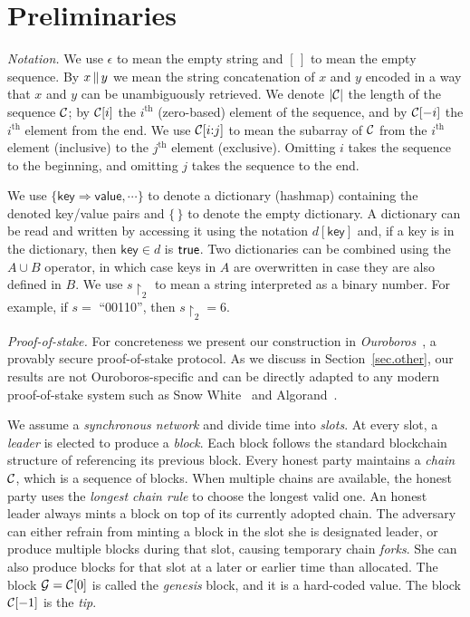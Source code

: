 \section{Preliminaries}

\noindent
\emph{Notation.}
We use $\epsilon$ to mean the empty string and $[\,]$ to mean the empty sequence.
By $x \,\|\, y$ we mean the string concatenation
of $x$ and $y$ encoded in a way that $x$ and $y$ can be unambiguously retrieved.
We denote $|\mathcal{C}|$ the length of the sequence $\mathcal{C}$; by $\mathcal{C}[i]$ the $i^\text{th}$ (zero-based)
element of the sequence, and by $\mathcal{C}[-i]$ the $i^\text{th}$ element from the end.
We use $\mathcal{C}[i{:}j]$ to mean the subarray of $\mathcal{C}$ from the $i^\text{th}$ element
(inclusive) to the $j^\text{th}$ element (exclusive). Omitting $i$ takes the sequence
to the beginning, and omitting $j$ takes the sequence to the end. 

We use $\{ \textsf{key} \Rightarrow \textsf{value}, \cdots \}$ to denote a dictionary (hashmap)
containing the denoted key/value pairs and $\{\,\}$ to denote the empty dictionary. A dictionary
can be read and written by accessing it using the notation $d[\textsf{key}]$ and, if a key is
in the dictionary, then $\textsf{key} \in d$ is $\mathsf{true}$. Two dictionaries
can be combined using the $A \cup B$ operator, in which case keys in $A$ are overwritten in
case they are also defined in $B$. We use $s\restriction_2$ to mean a string interpreted as
a binary number. For example, if $s = $ ``00110'', then $s\restriction_2 = 6$.

\noindent
\emph{Proof-of-stake.}
For concreteness
we present our construction in
\emph{Ouroboros}~\cite{ouroboros}, a provably secure proof-of-stake protocol.
As we discuss in Section~\ref{sec.other},
our results
are not Ouroboros-specific and can be directly adapted to any modern proof-of-stake
system such as Snow White~\cite{snowwhite} and Algorand~\cite{algorand}.

We assume a \emph{synchronous network} and divide time into \emph{slots}. At every
slot, a \emph{leader} is elected to produce a \emph{block}. Each block follows the
standard blockchain structure of referencing its previous block. Every honest party
maintains a \emph{chain} $\mathcal{C}$, which is a sequence of blocks. When multiple chains
are
available, the honest party uses the \emph{longest chain rule} to choose the longest
valid one. An honest leader always mints a block on top of its currently adopted chain.
The adversary can either refrain from minting a block in the slot she is designated
leader, or produce multiple blocks during that slot, causing temporary chain \emph{forks}.
She can also produce blocks for that slot at a later or earlier time than allocated.
The block $\mathcal{G} = \mathcal{C}[0]$
is called the \emph{genesis} block, and it is a hard-coded value. The block $\mathcal{C}[-1]$
is the \emph{tip}.

